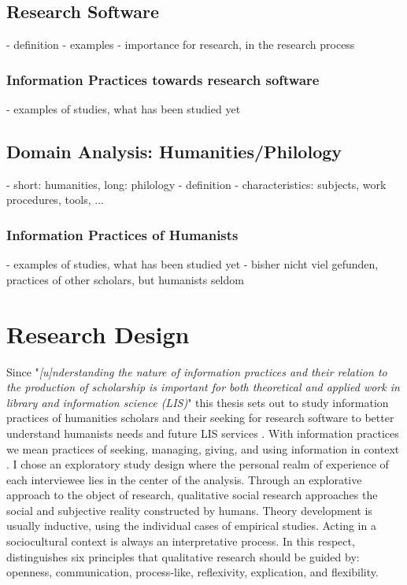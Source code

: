\documentclass[12pt, a4paper, titlepage, oneside, abstract=true, toc=listof, toc=bibliography]{scrreprt}
\begin{document}
\section{Research Software}
- definition
- examples
- importance for research, in the research process

\subsection{Information Practices towards research software}
- examples of studies, what has been studied yet

\section{Domain Analysis: Humanities/Philology}
- short: humanities, long: philology
- definition
- characteristics: subjects, work procedures, tools, ...

\subsection{Information Practices of Humanists}
- examples of studies, what has been studied yet
- bisher nicht viel gefunden, practices of other scholars, but humanists seldom
	
\chapter{Research Design}
Since "\textit{[u]nderstanding the nature of information practices and their relation to the production of scholarship is important for both theoretical and applied work in library and information science (LIS)}" \citep[p. 165]{Palmer2009} this thesis sets out to study information practices of humanities scholars and their seeking for research software to better understand humanists needs and future LIS services \citep{Case2008, Cunningham2010}. With information practices we mean practices of seeking, managing, giving, and using information in context \citep{Palmer2009}. I chose an exploratory study design \citep{Rinsdorf2013} where the personal realm of experience of each interviewee lies in the center of the analysis. Through an explorative approach to the object of research, qualitative social research approaches the social and subjective reality constructed by humans. Theory development is usually inductive, using the individual cases of empirical studies. Acting in a sociocultural context is always an interpretative process. In this respect, \citet[p. 20ff]{Lamnek2005} distinguishes six principles that qualitative research should be guided by: openness, communication, process-like, reflexivity, explication, and flexibility.
\end{document}
